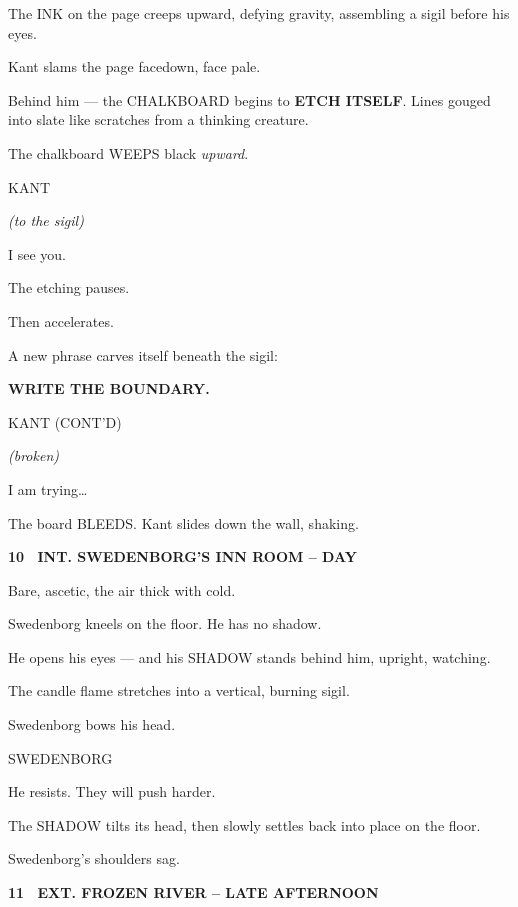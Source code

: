 \documentclass[12pt]{article}
\newcommand{\scene}[2]{%
  \vspace{1.8\baselineskip}%
  \noindent\textbf{#1 \ #2}\par\vspace{0.4\baselineskip}%
}
\newenvironment{dialogue}[1]{%
  \vspace{0.8\baselineskip}%
  \noindent\hspace*{2.3in}\textsc{#1}\par%
  \noindent\hspace*{1.5in}\begin{minipage}[t]{4.5in}%
}{%
  \end{minipage}\par%
}
\newcommand{\paren}[1]{%
  \noindent\hspace*{1.8in}\textit{(#1)}\par%
}
\newcommand{\centered}[1]{%
  \vspace{0.8\baselineskip}%
  \begin{center}#1\end{center}%
}
\begin{document}
The INK on the page creeps upward, defying gravity, assembling a sigil
before his eyes.

Kant slams the page facedown, face pale.

Behind him --- the CHALKBOARD begins to \textbf{ETCH ITSELF}. Lines gouged into
slate like scratches from a thinking creature.

The chalkboard WEEPS black \emph{upward}.

\begin{dialogue}{KANT}
\paren{to the sigil}
I see you.
\end{dialogue}

The etching pauses.

Then accelerates.

A new phrase carves itself beneath the sigil:

\centered{\textbf{WRITE THE BOUNDARY.}}

\begin{dialogue}{KANT (CONT'D)}
\paren{broken}
I am trying\ldots
\end{dialogue}

The board BLEEDS. Kant slides down the wall, shaking.


\scene{10}{INT. SWEDENBORG'S INN ROOM -- DAY}

Bare, ascetic, the air thick with cold.

Swedenborg kneels on the floor. He has no shadow.

He opens his eyes --- and his SHADOW stands behind him, upright,
watching.

The candle flame stretches into a vertical, burning sigil.

Swedenborg bows his head.

\begin{dialogue}{SWEDENBORG}
He resists. They will push harder.
\end{dialogue}

The SHADOW tilts its head, then slowly settles back into place on the
floor.

Swedenborg's shoulders sag.


\scene{11}{EXT. FROZEN RIVER -- LATE AFTERNOON}
\end{document}
